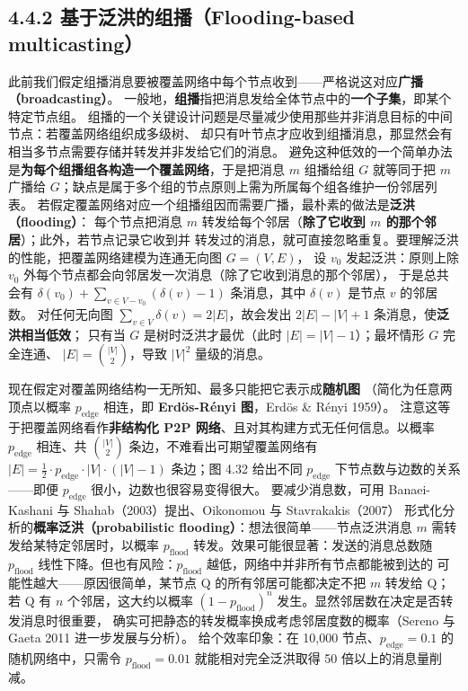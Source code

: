 
\subsection*{4.4.2 基于泛洪的组播（Flooding-based multicasting）}
此前我们假定组播消息要被覆盖网络中每个节点收到——严格说这对应\textbf{广播（broadcasting）}。
一般地，\textbf{组播}指把消息发给全体节点中的\textbf{一个子集}，即某个特定节点组。
组播的一个关键设计问题是尽量减少使用那些并非消息目标的中间节点：若覆盖网络组织成多级树、
却只有叶节点才应收到组播消息，那显然会有相当多节点需要存储并转发并非发给它们的消息。
避免这种低效的一个简单办法是\textbf{为每个组播组各构造一个覆盖网络}，于是把消息 $m$ 组播给组 $G$
就等同于把 $m$ 广播给 $G$；缺点是属于多个组的节点原则上需为所属每个组各维护一份邻居列表。
若假定覆盖网络对应一个组播组因而需要广播，最朴素的做法是\textbf{泛洪（flooding）}：
每个节点把消息 $m$ 转发给每个邻居（\textbf{除了它收到 $m$ 的那个邻居}）；此外，若节点记录它收到并
转发过的消息，就可直接忽略重复。要理解泛洪的性能，把覆盖网络建模为连通无向图 $G=(V,E)$，
设 $v_0$ 发起泛洪：原则上除 $v_0$ 外每个节点都会向邻居发一次消息（除了它收到消息的那个邻居），
于是总共会有 $\delta(v_0)+\sum_{v\in V-v_0}(\delta(v)-1)$ 条消息，其中 $\delta(v)$ 是节点 $v$ 的邻居数。
对任何无向图 $\sum_{v\in V}\delta(v)=2|E|$，故会发出 $2|E|-|V|+1$ 条消息，使\textbf{泛洪相当低效}；
只有当 $G$ 是树时泛洪才最优（此时 $|E|=|V|-1$）；最坏情形 $G$ 完全连通、
$|E|=\binom{|V|}{2}$，导致 $|V|^2$ 量级的消息。

\medskip\noindent 现在假定对覆盖网络结构一无所知、最多只能把它表示成\textbf{随机图}
（简化为任意两顶点以概率 $p_{\text{edge}}$ 相连，即 \textbf{Erdös-Rényi 图}，Erdös \& Rényi 1959）。
注意这等于把覆盖网络看作\textbf{非结构化 P2P 网络}、且对其构建方式无任何信息。以概率
$p_{\text{edge}}$ 相连、共 $\binom{|V|}{2}$ 条边，不难看出可期望覆盖网络有
$|E|=\frac{1}{2}\cdot p_{\text{edge}}\cdot|V|\cdot(|V|-1)$ 条边；图 4.32 给出不同
$p_{\text{edge}}$ 下节点数与边数的关系——即便 $p_{\text{edge}}$ 很小，边数也很容易变得很大。
要减少消息数，可用 Banaei-Kashani 与 Shahab（2003）提出、Oikonomou 与 Stavrakakis（2007）
形式化分析的\textbf{概率泛洪（probabilistic flooding）}：想法很简单——节点泛洪消息 $m$
需转发给某特定邻居时，以概率 $p_{\text{flood}}$ 转发。效果可能很显著：发送的消息总数随
$p_{\text{flood}}$ 线性下降。但也有风险：$p_{\text{flood}}$ 越低，网络中并非所有节点都能被到达的
可能性越大——原因很简单，某节点 Q 的所有邻居可能都决定不把 $m$ 转发给 Q；
若 Q 有 $n$ 个邻居，这大约以概率 $(1-p_{\text{flood}})^n$ 发生。显然邻居数在决定是否转发消息时很重要，
确实可把静态的转发概率换成考虑邻居度数的概率（Sereno 与 Gaeta 2011 进一步发展与分析）。
给个效率印象：在 10,000 节点、$p_{\text{edge}}=0.1$ 的随机网络中，只需令
$p_{\text{flood}}=0.01$ 就能相对完全泛洪取得 50 倍以上的消息量削减。

